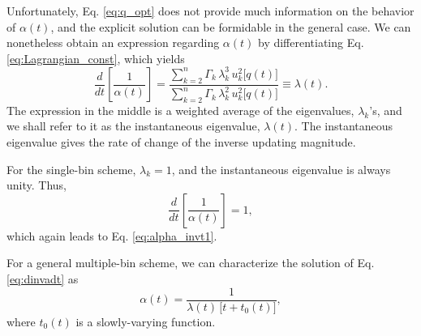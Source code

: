 \documentclass[reprint, floatfix]{revtex4-1}
\begin{document}
Unfortunately,
Eq. \eqref{eq:q_opt} does not provide much information
on the behavior of $\alpha(t)$,
and the explicit solution
can be formidable in the general case.
%
We can nonetheless obtain an expression regarding $\alpha(t)$
by differentiating Eq. \eqref{eq:Lagrangian_const},
which yields
%
\begin{equation}
  \frac{ d   }
       { d t }
  \left[
    \frac{       1     }
         { \alpha( t ) }
  \right]
  =
  \frac{
    \sum_{ k = 2 }^n
      \Gamma_k \, \lambda_k^3
      \, u_k^2 \bigl[ q(t) \bigr]
  }
  {
    \sum_{ k = 2 }^n
      \Gamma_k \, \lambda_k^2
      \, u_k^2 \bigl[ q(t) \bigr]
  }
  \equiv
  \lambda(t)
  .
  \label{eq:dinvadt}
\end{equation}
%
The expression in the middle is a weighted average
of the eigenvalues, $\lambda_k$'s,
and we shall refer to it as the instantaneous
eigenvalue, $\lambda(t)$.
%
The instantaneous eigenvalue
gives the rate of change of
the inverse updating magnitude.


For the single-bin scheme, $\lambda_k = 1$,
and the instantaneous eigenvalue is always unity.
Thus,
$$
\frac { d   }
      { d t }
\left[
  \frac{      1    }
       { \alpha(t) }
\right]
=
1,
$$
which again leads to Eq. \eqref{eq:alpha_invt1}.


For a general multiple-bin scheme,
we can characterize the solution of
Eq. \eqref{eq:dinvadt} as
\begin{equation}
  \alpha(t)
  =
  \frac{                  1                     }
       { \lambda(t) \, \bigl[ t + t_0(t) \bigr] }
,
  \label{eq:alpha_approxinvt}
\end{equation}
%
where
$t_0(t)$ is a slowly-varying function.
\end{document}
